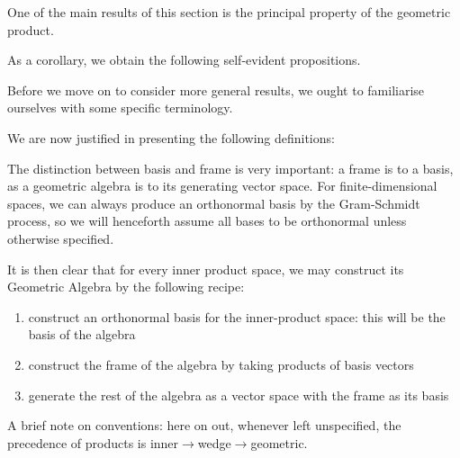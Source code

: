 One of the main results of this section is the principal property of the geometric product.



As a corollary, we obtain the following self-evident propositions.
%
%



Before we move on to consider more general results, we ought to familiarise ourselves with some specific terminology.


%
%





We are now justified in presenting the following definitions:







The distinction between basis and frame is very important: a frame is to a basis, as a geometric algebra is to its generating vector space.
For finite-dimensional spaces, we can always produce an orthonormal basis by the Gram-Schmidt process, so we will henceforth assume all bases to be orthonormal unless otherwise specified.

It is then clear that for every inner product space, we may construct its Geometric Algebra by the following recipe:
\begin{enumerate}
	\item construct an orthonormal basis for the inner-product space: this will be the basis of the algebra
	\item construct the frame of the algebra by taking products of basis vectors
	\item generate the rest of the algebra as a vector space with the frame as its basis
\end{enumerate}

% 
% 

A brief note on conventions: here on out, whenever left unspecified, the precedence of products is inner$\to$wedge$\to$geometric.

